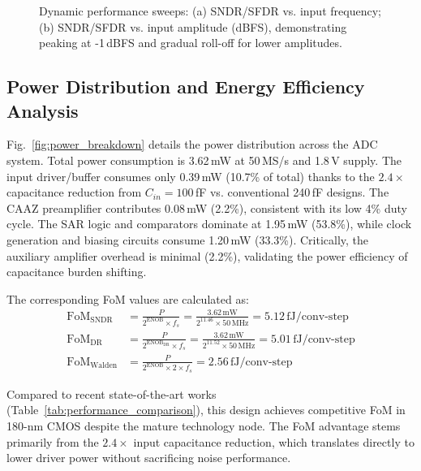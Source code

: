 \documentclass[journal]{IEEEtran}
\begin{document}
\begin{figure}[!t]
\centering
{}
\caption{Dynamic performance sweeps: (a) SNDR/SFDR vs. input frequency; (b) SNDR/SFDR vs. input amplitude (dBFS), demonstrating peaking at -1\,dBFS and gradual roll-off for lower amplitudes.}
\label{fig:dynamic_sweep}
\end{figure}

\subsection{Power Distribution and Energy Efficiency Analysis}
Fig.~\ref{fig:power_breakdown} details the power distribution across the ADC system. Total power consumption is 3.62\,mW at 50\,MS/s and 1.8\,V supply. The input driver/buffer consumes only 0.39\,mW (10.7\% of total) thanks to the $2.4\times$ capacitance reduction from $C_{in}=100$\,fF vs. conventional 240\,fF designs. The CAAZ preamplifier contributes 0.08\,mW (2.2\%), consistent with its low 4\% duty cycle. The SAR logic and comparators dominate at 1.95\,mW (53.8\%), while clock generation and biasing circuits consume 1.20\,mW (33.3\%). Critically, the auxiliary amplifier overhead is minimal (2.2\%), validating the power efficiency of capacitance burden shifting.

The corresponding FoM values are calculated as:
\begin{align}
\text{FoM}_{\text{SNDR}} &= \frac{P}{2^{\text{ENOB}} \times f_s} = \frac{3.62\,\text{mW}}{2^{11.46} \times 50\,\text{MHz}} = 5.12\,\text{fJ/conv-step} \\
\text{FoM}_{\text{DR}} &= \frac{P}{2^{\text{ENOB}_{\text{DR}}} \times f_s} = \frac{3.62\,\text{mW}}{2^{11.52} \times 50\,\text{MHz}} = 5.01\,\text{fJ/conv-step} \\
\text{FoM}_{\text{Walden}} &= \frac{P}{2^{\text{ENOB}} \times 2 \times f_s} = 2.56\,\text{fJ/conv-step}
\end{align}

Compared to recent state-of-the-art works (Table~\ref{tab:performance_comparison}), this design achieves competitive FoM in 180-nm CMOS despite the mature technology node. The FoM advantage stems primarily from the $2.4\times$ input capacitance reduction, which translates directly to lower driver power without sacrificing noise performance.
\end{document}

